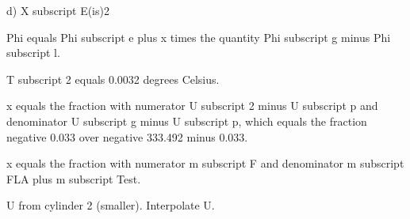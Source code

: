 d) X subscript E(is)2

Phi equals Phi subscript e plus x times the quantity Phi subscript g minus Phi subscript l.

T subscript 2 equals 0.0032 degrees Celsius.

x equals the fraction with numerator U subscript 2 minus U subscript p and denominator U subscript g minus U subscript p, which equals the fraction negative 0.033 over negative 333.492 minus 0.033.

x equals the fraction with numerator m subscript F and denominator m subscript FLA plus m subscript Test.

U from cylinder 2 (smaller).
Interpolate U.